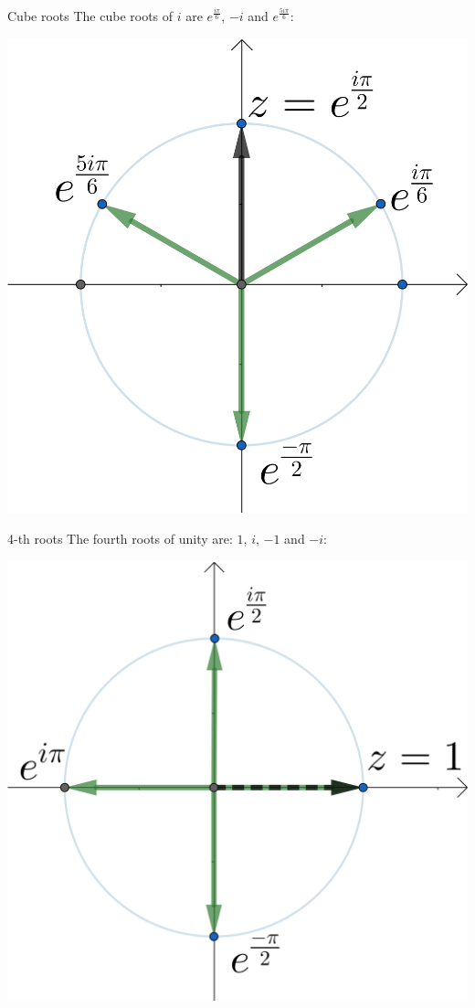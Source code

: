 \documentclass{beamer}
\begin{document}
\begin{frame}{Cube roots}
The cube roots of $i$ are $e^{\frac{i\pi}{6}}$, $-i$ and $e^{\frac{5i\pi}{6}}$:
\begin{center}
\includegraphics[scale=2]{cube-pi-2.png}
\end{center}
\end{frame}

\begin{frame}{4-th roots}
The fourth roots of unity are: $1$, $i$, $-1$ and $-i$:
\begin{center}
\includegraphics[scale=2]{four-roots-unity.png}
\end{center}
\end{frame}
\end{document}
